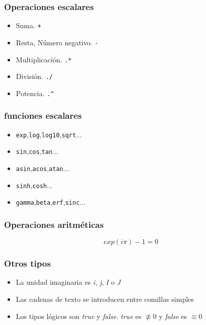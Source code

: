 \documentclass[12pt]{beamer}
\begin{document}
\begin{frame}
  \frametitle{Operaciones escalares}
  \begin{itemize}
  \item Suma. \texttt{+}
  \item Resta, Número negativo. \texttt{-}
  \item Multiplicación. \texttt{.*}
  \item División. \texttt{./}
  \item Potencia. \texttt{.\^}
  \end{itemize}
\end{frame}

\begin{frame}
  \frametitle{funciones escalares}
  \begin{itemize}
  \item \texttt{exp},\texttt{log},\texttt{log10},\texttt{sqrt}...
  \item \texttt{sin},\texttt{cos},\texttt{tan}...
  \item \texttt{asin},\texttt{acos},\texttt{atan}...
  \item \texttt{sinh},\texttt{cosh}...
  \item \texttt{gamma},\texttt{beta},\texttt{erf},\texttt{sinc}...
  \end{itemize}
\end{frame}


\begin{frame}
  \frametitle{Operaciones aritméticas}
  \[ exp(i \pi) - 1 = 0  \]
  \testcode
\end{frame}

\begin{frame}
  \frametitle{Otros tipos}
  \begin{itemize}
  \item La unidad imaginaria es \emph{i}, \emph{j}, \emph{I} o \emph{J}
  \item Las cadenas de texto se introducen entre comillas simples
  \item Los tipos lógicos son \emph{true} y \emph{false}.  \emph{true}
    es $\not \equiv 0$ y \emph{false} es $\equiv 0$
  \end{itemize}
\end{frame}

\end{document}
